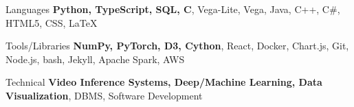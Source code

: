 

\begin{cvskills}

  \cvskill
    {Languages} %
    {{\bf Python, TypeScript, SQL, C}, Vega-Lite, Vega, Java, C++, C\#, HTML5, CSS, LaTeX} %

  \cvskill
    {Tools/Libraries} %
    {{\bf NumPy, PyTorch, D3, Cython}, React, Docker, Chart.js, Git, Node.js, bash, Jekyll, Apache Spark, AWS} %

  \cvskill
    {Technical} %
    {{\bf Video Inference Systems, Deep/Machine Learning, Data Visualization}, DBMS, Software Development} %


\end{cvskills}